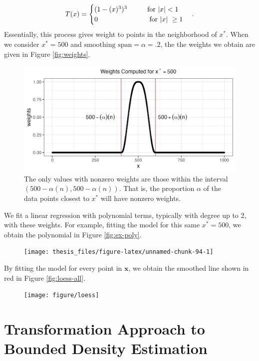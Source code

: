 \documentclass[12pt,twoside]{smiththesis}
\begin{document}
\[
T(x) = \begin{cases} (1-(x)^3)^3 \hspace{9 mm}  \text{ for } |x| < 1\\
0  \hspace{25 mm} \text{ for $|x|$ } \geq 1 \end{cases}.
\]
Essentially, this process gives weight to points in the neighborhood of \(x^*\). When we consider \(x^* = 500\) and \(\text{smoothing span} = \alpha = .2\), the the weights we obtain are given in Figure \ref{fig:weights}.
\begin{figure}

{\centering \includegraphics[width=1\linewidth]{figure/weights} 

}

\caption{\label{fig:weights} The only values with nonzero weights are those within the interval $(500 - \alpha (n), 500 - \alpha (n))$. That is, the proportion $\alpha$ of the data points closest to $x^*$ will have nonzero weights.}\label{fig:unnamed-chunk-93}
\end{figure}
\newpage

We fit a linear regression with polynomial terms, typically with degree up to 2, with these weights. For example, fitting the model for this same \(x^*=500\), we obtain the polynomial in Figure \ref{fig:ex-poly}.
\begin{flushleft}
\begin{figure}

{\centering \texttt{[image: thesis\_files/figure-latex/unnamed-chunk-94-1]} 

}

\caption{\label{fig:ex-poly}}\label{fig:unnamed-chunk-94}
\end{figure}
\end{flushleft}
By fitting the model for every point in \(\mathbf x\), we obtain the smoothed line shown in red in Figure \ref{fig:loess-all}.
\begin{figure}

{\centering \texttt{[image: figure/loess]} 

}

\caption{\label{fig:loess-all}}\label{fig:unnamed-chunk-96}
\end{figure}
\hypertarget{bounded-density-transform}{%
\section{Transformation Approach to Bounded Density Estimation}\label{bounded-density-transform}}
\end{document}

